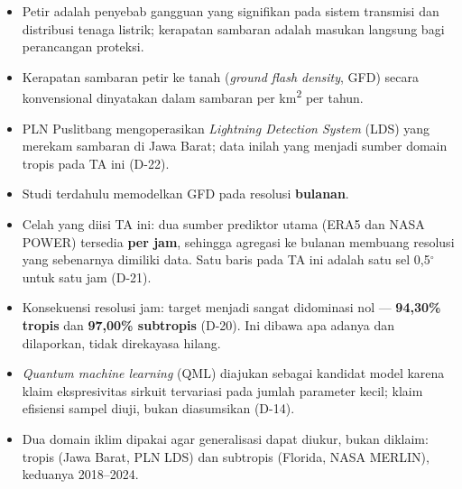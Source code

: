 \begin{itemize}
    \item Petir adalah penyebab gangguan yang signifikan pada sistem transmisi
          dan distribusi tenaga listrik; kerapatan sambaran adalah masukan
          langsung bagi perancangan proteksi.
    \item Kerapatan sambaran petir ke tanah (\textit{ground flash density}, GFD)
          secara konvensional dinyatakan dalam sambaran per km\textsuperscript{2}
          per tahun.
    \item PLN Puslitbang mengoperasikan \textit{Lightning Detection System} (LDS)
          yang merekam sambaran di Jawa Barat; data inilah yang menjadi sumber
          domain tropis pada TA ini (D-22).
    \item Studi terdahulu memodelkan GFD pada resolusi \textbf{bulanan}.
    \item Celah yang diisi TA ini: dua sumber prediktor utama (ERA5 dan NASA
          POWER) tersedia \textbf{per jam}, sehingga agregasi ke bulanan membuang
          resolusi yang sebenarnya dimiliki data. Satu baris pada TA ini adalah
          satu sel 0,5$^\circ$ untuk satu jam (D-21).
    \item Konsekuensi resolusi jam: target menjadi sangat didominasi nol —
          \textbf{94,30\% tropis} dan \textbf{97,00\% subtropis} (D-20). Ini
          dibawa apa adanya dan dilaporkan, tidak direkayasa hilang.
    \item \textit{Quantum machine learning} (QML) diajukan sebagai kandidat model
          karena klaim ekspresivitas sirkuit tervariasi pada jumlah parameter
          kecil; klaim efisiensi sampel diuji, bukan diasumsikan (D-14).
    \item Dua domain iklim dipakai agar generalisasi dapat diukur, bukan
          diklaim: tropis (Jawa Barat, PLN LDS) dan subtropis (Florida, NASA
          MERLIN), keduanya 2018--2024.
\end{itemize}

